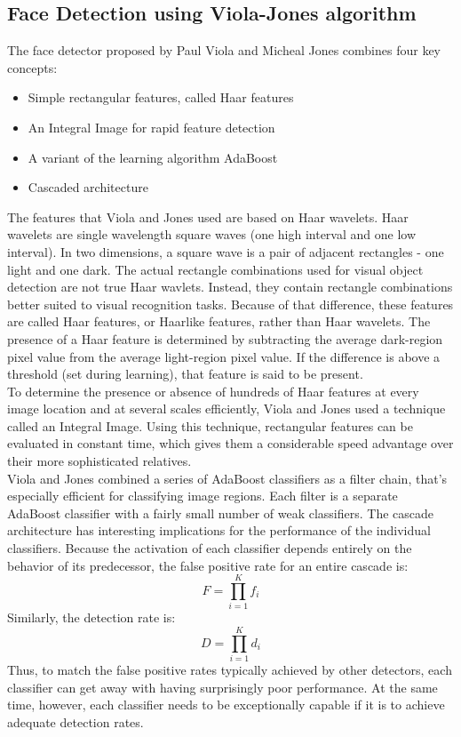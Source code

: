 \documentclass[%
        final,
        notitlepage,
        narroweqnarray,
        inline,
        ]{ieee}
\begin{document}
\subsection{Face Detection using Viola-Jones algorithm}
The face detector proposed by Paul Viola and Micheal Jones\cite{Viola01} combines four key concepts\cite{servo}:
\begin{itemize}
	\item Simple rectangular features, called Haar features
	\item An Integral Image for rapid feature detection
	\item A variant of the learning algorithm AdaBoost
	\item Cascaded architecture
\end{itemize}
The features that Viola and Jones used are based on Haar wavelets.
Haar wavelets are single wavelength square waves (one high interval and one low interval).
In two dimensions, a square wave is a pair of adjacent rectangles - one light and one dark.
The actual rectangle combinations used for visual object detection are not true Haar wavlets.
Instead, they contain rectangle combinations better suited to visual recognition tasks.
Because of that difference, these features are called Haar features, or Haarlike features, rather than Haar wavelets.
The presence of a Haar feature is determined by subtracting the average dark-region pixel value from the average light-region pixel value.
If the difference is above a threshold (set during learning), that feature is said to be present.\\
To determine the presence or absence of hundreds of Haar features at every image location and at several scales efficiently, Viola and Jones used a technique called an Integral Image.
Using this technique, rectangular features can be evaluated in constant time, which gives them a considerable speed advantage over their more sophisticated relatives.\\
Viola and Jones combined a series of AdaBoost classifiers as a filter chain, that's especially efficient for classifying image regions.
Each filter is a separate AdaBoost classifier with a fairly small number of weak classifiers.
The cascade architecture has interesting implications for the performance of the individual classifiers. Because the activation of each classifier depends entirely on the behavior of its predecessor, the false positive rate for an entire cascade is:
\begin{equation}
F = \prod _{i=1}^{K} f_i
\end{equation}
Similarly, the detection rate is:
\begin{equation}
D = \prod _{i=1}^{K} d_i
\end{equation}
Thus, to match the false positive rates typically achieved by other detectors, each classifier can get away with having surprisingly poor performance. At the same time, however, each classifier needs to be exceptionally capable if it is to achieve adequate detection rates.
\end{document}
